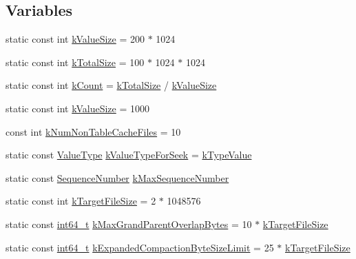 \subsection*{Variables}
\begin{DoxyCompactItemize}
\item 
static const int \hyperlink{namespaceleveldb_a193cc831a2200dd1c5e6aee70d6654d3}{k\-Value\-Size} = 200 $\ast$ 1024
\item 
static const int \hyperlink{namespaceleveldb_aef708b670e7c242e59bd3b0c9fb19fe5}{k\-Total\-Size} = 100 $\ast$ 1024 $\ast$ 1024
\item 
static const int \hyperlink{namespaceleveldb_a9bd5c84d01be4af58d509c6aafc20d85}{k\-Count} = \hyperlink{namespaceleveldb_aef708b670e7c242e59bd3b0c9fb19fe5}{k\-Total\-Size} / \hyperlink{namespaceleveldb_a193cc831a2200dd1c5e6aee70d6654d3}{k\-Value\-Size}
\item 
static const int \hyperlink{namespaceleveldb_a193cc831a2200dd1c5e6aee70d6654d3}{k\-Value\-Size} = 1000
\item 
const int \hyperlink{namespaceleveldb_a550686b2c442f4c3011d68dd12c38662}{k\-Num\-Non\-Table\-Cache\-Files} = 10
\item 
static const \hyperlink{namespaceleveldb_acc038cb0d608414730cafa459a4ba866}{Value\-Type} \hyperlink{namespaceleveldb_a0b7840e7de67fb0f7905955c02f75cfa}{k\-Value\-Type\-For\-Seek} = \hyperlink{namespaceleveldb_acc038cb0d608414730cafa459a4ba866a97725c1d8e3317d1bac1f3b14fbfa281}{k\-Type\-Value}
\item 
static const \hyperlink{namespaceleveldb_a5481ededd221c36d652c371249f869fa}{Sequence\-Number} \hyperlink{namespaceleveldb_adf59027c8c0dcc54c9d8c3e5ba090463}{k\-Max\-Sequence\-Number}
\item 
static const int \hyperlink{namespaceleveldb_aa8eab3a12c3da0efefd9fe53f904440b}{k\-Target\-File\-Size} = 2 $\ast$ 1048576
\item 
static const \hyperlink{stdint_8h_adec1df1b8b51cb32b77e5b86fff46471}{int64\-\_\-t} \hyperlink{namespaceleveldb_a68616c3e44088cbae698a3c2b385082f}{k\-Max\-Grand\-Parent\-Overlap\-Bytes} = 10 $\ast$ \hyperlink{namespaceleveldb_aa8eab3a12c3da0efefd9fe53f904440b}{k\-Target\-File\-Size}
\item 
static const \hyperlink{stdint_8h_adec1df1b8b51cb32b77e5b86fff46471}{int64\-\_\-t} \hyperlink{namespaceleveldb_a226c83695ff13a8d8bc5a248bdd4bd29}{k\-Expanded\-Compaction\-Byte\-Size\-Limit} = 25 $\ast$ \hyperlink{namespaceleveldb_aa8eab3a12c3da0efefd9fe53f904440b}{k\-Target\-File\-Size}
\item 

\end{DoxyCompactItemize}

